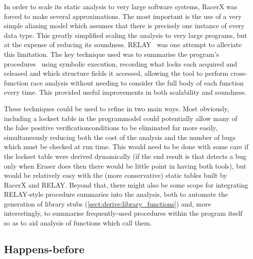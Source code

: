 In order to scale its static analysis to very large software systems,
RacerX was forced to make several approximations.  The most important
is the use of a very simple aliasing model which assumes that there is
precisely one instance of every data type.  This greatly simplified
scaling the analysis to very large programs, but at the expense of
reducing its soundness.  RELAY~\cite{Voung2007} was one attempt to
alleviate this limitation.  The key technique used was to summarise
the program's procedures~\cite{Qadeer2004} using symbolic execution,
recording what locks each acquired and released and which structure
fields it accessed, allowing the tool to perform cross-function race
analysis without needing to consider the full body of each function
every time.  This provided useful improvements in both scalability and
soundness.

These techniques could be used to refine {\technique} in two main
ways.  Most obviously, including a lockset table in the
\gls{programmodel} could potentially allow many of the false positive
\glspl{verificationcondition} to be eliminated far more easily,
simultaneously reducing both the cost of the analysis and the number
of bugs which must be checked at run time.  This would need to be done
with some care if the lockset table were derived dynamically (if the
end result is that {\technique} detects a bug only when Eraser does
then there would be little point in having both tools), but would be
relatively easy with the (more conservative) static tables built by
RacerX and RELAY.  Beyond that, there might also be some scope for
integrating RELAY-style procedure summaries into the {\technique}
analysis, both to automate the generation of library stubs
(\autoref{sect:derive:library_functions}) and, more interestingly, to
summarise frequently-used procedures within the program itself so as
to aid analysis of functions which call them.

\subsection{Happens-before}

